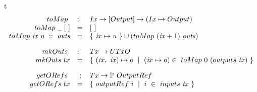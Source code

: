 \begin{ruledfigure}{t}
  \begin{displaymath}
  \begin{array}{rll}
    \fun{toMap}~ &:& \Ix \to [\Output] \to (\Ix \mapsto \Output) \\
    \fun{toMap}~\wcard~[~] &=& [~] \\
    \fun{toMap}~\var{ix}~u~::~\var{outs} &=& \{~\var{ix}\mapsto u~\} \cup (\fun{toMap}~(\var{ix}+1)~\var{outs})
    \nextdef
    \fun{mkOuts}~ &:& \Tx \to \UTxO \\
    \fun{mkOuts}~{tx} &=& \{~(\var{tx},~\var{ix}) \mapsto o~ \mid~(\var{ix} \mapsto o)\in~\fun{toMap}~0~(\outputs~\var{tx})~\}
    \nextdef
    \fun{getORefs}~&~:& \Tx \to \powerset{\OutputRef} \\
    \fun{getORefs}~{tx} &=& \{~\outputref~i~\mid~i~\in~\inputs~\var{tx} ~\}

\end{array}
\end{displaymath}
\end{ruledfigure}
